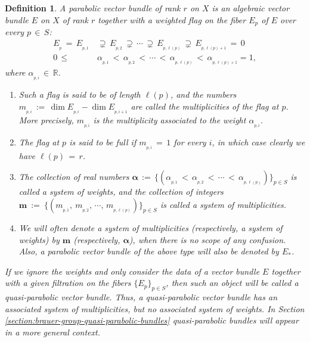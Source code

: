 \documentclass[10pt,reqno]{amsart}
\theoremstyle{myroman}
\newtheorem{definition}[theorem]{Definition}
\numberwithin{equation}{section}
\begin{document}
	\begin{definition}\label{def:parabolic-bundles}
		A \textit{parabolic vector bundle} of rank $r$ on $X$ is an algebraic vector bundle $E$
		on $X$ of rank $r$ together with a weighted flag on the fiber $E_p$ of $E$ over every $p\,\in\, S$:
		\begin{align}\label{eqn:filtration-data}
			E_{_p} \,=\, E_{_{p,1}}\,&\supsetneq\, E_{_{p,2}}\,\supsetneq\, \cdots \,\supsetneq\, E_{_{p,\ell(p)}}
			\,\supsetneq\, E_{_{p,\ell(p)+1}} \,=\,0\\
			0\,\leq\, &\alpha_{_{p,1}}\,<\,\alpha_{_{p,2}} \,<\,\cdots\,<\,\alpha_{_{p,\ell(p)}}\,<\,\alpha_{_{p,\ell(p)+1}}=1,\nonumber
		\end{align}
		where $\alpha_{_{p,i}}\, \in\, \mathbb R$. 
		\begin{enumerate}[$\bullet$]
			\item Such a flag is said to be of length $\ell(p)$, and the numbers $m_{_{p,i}} \,:=\, \dim E_{_{p,i}} -
			\dim E_{_{p,i+1}}$ are called the \textit{multiplicities} of the flag at $p$. More precisely,
			$m_{_{p,i}}$ is the multiplicity associated to the weight $\alpha_{_{p,i}}$.
			
			\item The flag at $p$ is said to be \textit{full} if $m_{_{p,i}} \,=\,1$ for every $i$, in 
			which case clearly we have $\ell(p) \,=\, r$.
			
			\item The collection of real numbers $\boldsymbol{\alpha}\,:=\,\{(\alpha_{_{p,1}}
			\,<\,\alpha_{_{p,2}}\,<\,\cdots\,<\,\alpha_{_{p,\ell(p)}})\}_{p\in S}$ is called a system
			of weights, and the collection of integers $\boldsymbol{m}\ :=\ \{(m_{_{p,1}},\ m_{_{p,2}},\,\cdots,\,m_{_{p,\ell(p)}})\}_{p\in S}$ is called a system	of multiplicities.
			
			\item We will often denote a system of multiplicities (respectively, a system of weights) by
			$\boldsymbol{m}$ (respectively, $\boldsymbol{\alpha}$), when there is no scope of any confusion. Also,
			a parabolic vector bundle of the above type will also be denoted by $E_*$.
		\end{enumerate}
		
		If we ignore the weights and only consider the data of a vector bundle $E$ together with a given
		filtration on the fibers $\{E_p\}_{p\in S}$, then such an object will be called a
		\textit{quasi-parabolic vector bundle}. Thus, a quasi-parabolic vector bundle has an associated system
		of multiplicities, but no associated system of weights. In Section \ref{section:brauer-group-quasi-parabolic-bundles}
		quasi-parabolic bundles will appear in a more general context.
		
	\end{definition}
\end{document}
